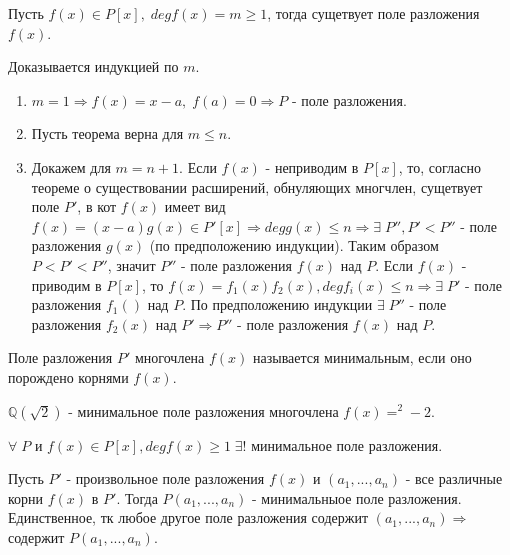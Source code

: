 \begin{proofs}
	Пусть $f(x) \in P[x],\; degf(x) = m \geq 1$, тогда сущетвует поле разложения $f(x)$.
  \begin{dokvo}
    Доказывается индукцией по $m.\;$
    \begin{enumerate}
    \item $m = 1 \Rightarrow f(x) = x-a,\; f(a) = 0 \Rightarrow P$ - поле разложения.
    \item Пусть теорема верна для $m \leq n$.
    \item Докажем для $m = n + 1$. Если $f(x)$ - неприводим в $P[x]$, то, согласно теореме о существовании расширений, обнуляющих многчлен,
    сущетвует поле $P'$, в кот $f(x)$ имеет вид $f(x) = (x-a)g(x) \in P'[x] \Rightarrow degg(x) \leq n \Rightarrow \exists\; P'', P' < P''$
    - поле разложения $g(x)$ (по предположению индукции). Таким образом $P < P' < P''$, значит $P''$ - поле разложения
    $f(x)$ над $P$. Если $f(x)$ - приводим в $P[x]$, то $f(x) = f_1(x)f_2(x), degf_i(x) \leq n \Rightarrow \exists\; P'$ - поле разложения
    $f_1()$ над $P$. По предположению индукции $\exists\; P''$ - поле разложения $f_2(x)$ над $P'\Rightarrow P''$ - поле разложения
    $f(x)$ над $P$.
  \end{enumerate}
	\end{dokvo}
\end{proofs}

\begin{defs}
  Поле разложения $P'$ многочлена $f(x)$ называется минимальным, если оно порождено корнями $f(x)$.
\end{defs}

\begin{example}
  $\mathbb{Q}(\sqrt{2})$ - минимальное поле разложения многочлена $f(x) = ^2 - 2$.
\end{example}

\begin{proofs}
	$\forall\; P$ и $f(x) \in P[x], degf(x) \geq 1\; \exists!$ минимальное поле разложения.
  \begin{dokvo}
    Пусть $P'$ - произвольное поле разложения $f(x)$ и $(a_1, ... , a_n)$ - все различные корни $f(x)$ в $P'$.
    Тогда $P(a_1, ... , a_n)$ - минимальныое поле разложения. Единственное, тк любое другое поле разложения содержит
    $(a_1, ... , a_n) \Rightarrow $ содержит $P(a_1, ... , a_n)$.
	\end{dokvo}
\end{proofs}

\newpage
